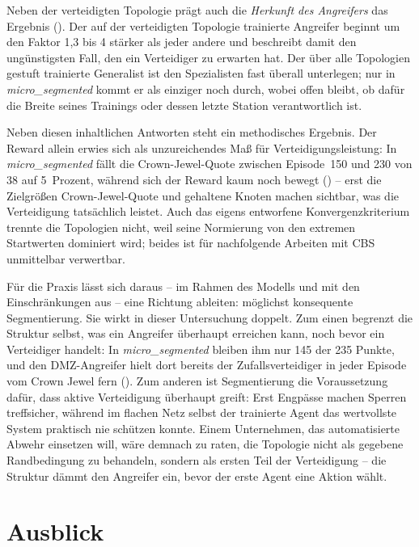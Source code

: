 Neben der verteidigten Topologie prägt auch die \emph{Herkunft des
Angreifers} das Ergebnis (). Der auf der verteidigten Topologie
trainierte Angreifer beginnt um den Faktor 1,3 bis 4 stärker als jeder
andere und beschreibt damit den ungünstigsten Fall, den ein Verteidiger zu
erwarten hat. Der über alle Topologien gestuft
trainierte Generalist ist den Spezialisten fast überall unterlegen; nur in
\emph{micro\_segmented} kommt er als einziger noch durch, wobei offen
bleibt, ob dafür die Breite seines Trainings oder dessen letzte Station
verantwortlich ist.

Neben diesen inhaltlichen Antworten steht ein methodisches Ergebnis. Der
Reward allein erwies sich als unzureichendes Maß für
Verteidigungsleistung: In \emph{micro\_segmented} fällt die
Crown-Jewel-Quote zwischen Episode~150 und 230 von 38 auf 5~Prozent,
während sich der Reward kaum noch bewegt () -- erst
die Zielgrößen Crown-Jewel-Quote und gehaltene Knoten machen sichtbar, was
die Verteidigung tatsächlich leistet. Auch das eigens entworfene
Konvergenzkriterium trennte die Topologien nicht, weil seine Normierung
von den extremen Startwerten dominiert wird; beides ist für nachfolgende
Arbeiten mit \ac{CBS} unmittelbar verwertbar.

Für die Praxis lässt sich daraus -- im Rahmen des Modells und mit den
Einschränkungen aus  -- eine Richtung ableiten:
möglichst konsequente Segmentierung. Sie wirkt in dieser Untersuchung
doppelt. Zum einen begrenzt die Struktur selbst, was ein Angreifer
überhaupt erreichen kann, noch bevor ein Verteidiger handelt: In
\emph{micro\_segmented} bleiben ihm nur 145 der 235 Punkte, und den
DMZ-Angreifer hielt dort bereits der Zufallsverteidiger in jeder Episode
vom Crown Jewel fern (). Zum anderen ist Segmentierung die Voraussetzung
dafür, dass aktive Verteidigung überhaupt greift: Erst Engpässe machen
Sperren treffsicher, während im flachen Netz selbst der trainierte Agent
das wertvollste System praktisch nie schützen konnte. Einem Unternehmen,
das automatisierte Abwehr einsetzen will, wäre demnach zu raten, die
Topologie nicht als gegebene Randbedingung zu behandeln, sondern als
ersten Teil der Verteidigung -- die Struktur dämmt den Angreifer ein,
bevor der erste Agent eine Aktion wählt.

\section{Ausblick}
\label{sec:ausblick}

